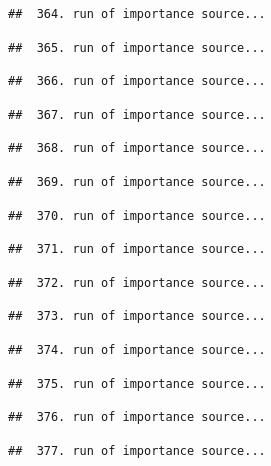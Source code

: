 \documentclass[
]{article}
\begin{document}
\begin{verbatim}
##  364. run of importance source...
\end{verbatim}

\begin{verbatim}
##  365. run of importance source...
\end{verbatim}

\begin{verbatim}
##  366. run of importance source...
\end{verbatim}

\begin{verbatim}
##  367. run of importance source...
\end{verbatim}

\begin{verbatim}
##  368. run of importance source...
\end{verbatim}

\begin{verbatim}
##  369. run of importance source...
\end{verbatim}

\begin{verbatim}
##  370. run of importance source...
\end{verbatim}

\begin{verbatim}
##  371. run of importance source...
\end{verbatim}

\begin{verbatim}
##  372. run of importance source...
\end{verbatim}

\begin{verbatim}
##  373. run of importance source...
\end{verbatim}

\begin{verbatim}
##  374. run of importance source...
\end{verbatim}

\begin{verbatim}
##  375. run of importance source...
\end{verbatim}

\begin{verbatim}
##  376. run of importance source...
\end{verbatim}

\begin{verbatim}
##  377. run of importance source...
\end{verbatim}
\end{document}
